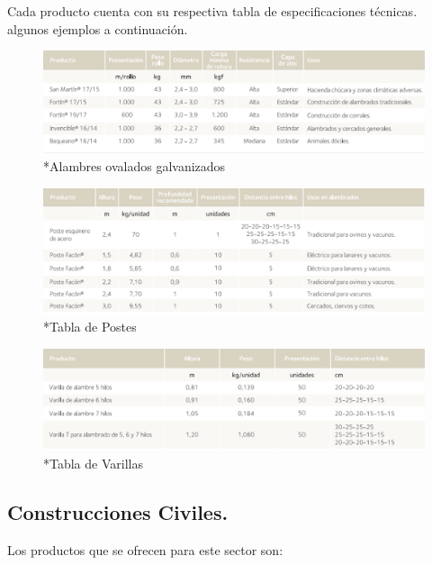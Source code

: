 \documentclass[12pt,a4paper]{article}
\begin{document}
Cada producto cuenta con su respectiva tabla de especificaciones técnicas. algunos ejemplos a continuación.
\begin{figure}[H]    
    \centering         
    \includegraphics[width=1\textwidth]{Inagenes para latex/10.png}
    \caption*{*Alambres ovalados galvanizados}
\end{figure}
 \begin{figure}[H]    
    \centering         
    \includegraphics[width=1\textwidth]{Inagenes para latex/11.png}
    \caption*{*Tabla de Postes}
\end{figure}
 \begin{figure}[H]    
    \centering         
    \includegraphics[width=1\textwidth]{Inagenes para latex/12.png}
    \caption*{*Tabla de Varillas}
\end{figure}


\subsection{Construcciones Civiles.}
Los productos que se ofrecen para este sector son:
\end{document}
